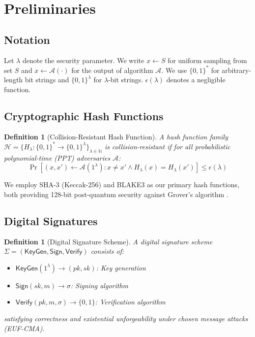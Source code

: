 \documentclass[11pt,a4paper]{article}
\newtheorem{definition}[theorem]{Definition}
\begin{document}
\section{Preliminaries}
\label{sec:preliminaries}

\subsection{Notation}

Let $\lambda$ denote the security parameter. We write $x \leftarrow S$ for uniform sampling from set $S$ and $x \leftarrow \mathcal{A}(\cdot)$ for the output of algorithm $\mathcal{A}$. We use $\{0,1\}^*$ for arbitrary-length bit strings and $\{0,1\}^\lambda$ for $\lambda$-bit strings. $\epsilon(\lambda)$ denotes a negligible function.

\subsection{Cryptographic Hash Functions}

\begin{definition}[Collision-Resistant Hash Function]
A hash function family $\mathcal{H} = \{H_\lambda : \{0,1\}^* \to \{0,1\}^\lambda\}_{\lambda \in \mathbb{N}}$ is collision-resistant if for all probabilistic polynomial-time (PPT) adversaries $\mathcal{A}$:
\begin{equation}
\Pr[(x,x') \leftarrow \mathcal{A}(1^\lambda) : x \neq x' \land H_\lambda(x) = H_\lambda(x')] \leq \epsilon(\lambda)
\end{equation}
\end{definition}

We employ SHA-3 (Keccak-256) \cite{Bertoni2013} and BLAKE3 \cite{OConnor2020} as our primary hash functions, both providing 128-bit post-quantum security against Grover's algorithm \cite{Grover1996}.

\subsection{Digital Signatures}

\begin{definition}[Digital Signature Scheme]
A digital signature scheme $\Sigma = (\mathsf{KeyGen}, \mathsf{Sign}, \mathsf{Verify})$ consists of:
\begin{itemize}
    \item $\mathsf{KeyGen}(1^\lambda) \to (pk, sk)$: Key generation
    \item $\mathsf{Sign}(sk, m) \to \sigma$: Signing algorithm
    \item $\mathsf{Verify}(pk, m, \sigma) \to \{0,1\}$: Verification algorithm
\end{itemize}
satisfying correctness and existential unforgeability under chosen message attacks (EUF-CMA).
\end{definition}
\end{document}

